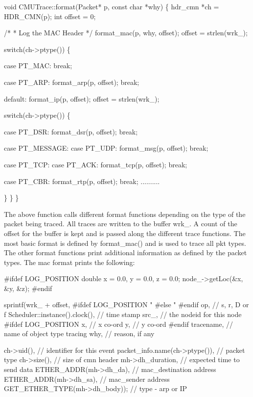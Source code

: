 \begin{program}
void CMUTrace::format(Packet* p, const char *why)
\{
	hdr_cmn *ch = HDR_CMN(p);
	int offset = 0;

	/*
	 * Log the MAC Header
	 */
	format_mac(p, why, offset);
	offset = strlen(wrk_);

	switch(ch->ptype()) \{

	case PT_MAC:
		break;

	case PT_ARP:
		format_arp(p, offset);
		break;

	default:
		format_ip(p, offset);
		offset = strlen(wrk_);

		switch(ch->ptype()) \{

		case PT_DSR:
			format_dsr(p, offset);
			break;

		case PT_MESSAGE:
		case PT_UDP:
			format_msg(p, offset);
			break;
			
		case PT_TCP:
		case PT_ACK:
			format_tcp(p, offset);
			break;
			
		case PT_CBR:
			format_rtp(p, offset);
			break;
		..........

		\}
	\}
\}
\end{program}
The above function calls different format functions depending on the type
of the packet being traced. All traces are written to the buffer wrk\_. A
count of the offset for the buffer is kept and is passed along the
different trace functions. The most basic format is defined by
format\_mac() and is used to trace all pkt types. The other format
functions print additional information as defined by the packet types. The
mac format prints the following:   

\begin{program}
\#ifdef LOG_POSITION
        double x = 0.0, y = 0.0, z = 0.0;
        node_->getLoc(&x, &y, &z);
\#endif

	sprintf(wrk_ + offset,
\#ifdef LOG_POSITION
		"%
\#else
		"%
\#endif
		op,                    // s, r, D or f
		Scheduler::instance().clock(),  // time stamp
                src_,                  // the nodeid for this node
\#ifdef LOG_POSITION
                x,                     // x co-ord 
                y,                     // y co-ord
\#endif
		tracename,             // name of object type tracing
		why,                   // reason, if any

                ch->uid(),             // identifier for this event
		packet_info.name(ch->ptype()), // packet type
		ch->size(),                    // size of cmn header
		mh->dh_duration,       // expected time to send data 
		ETHER_ADDR(mh->dh_da), // mac_destination address
		ETHER_ADDR(mh->dh_sa),         // mac_sender address
		GET_ETHER_TYPE(mh->dh_body));  // type - arp or IP
\end{program}

